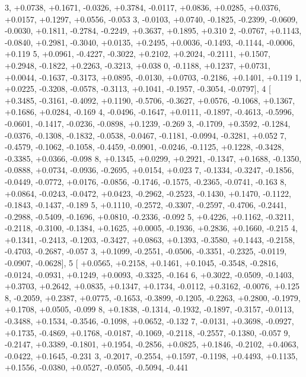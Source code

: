 \begin{DoxyCode}
      3, +0.0738, +0.1671, -0.0326, +0.3784, -0.0117, +0.0836, +0.0285, +0.0376, +0.0157, +0.1297, +0.0556, -0.053
      3, -0.0103, +0.0740, -0.1825, -0.2399, -0.0609, -0.0030, +0.1811, -0.2784, -0.2249, +0.3637, +0.1895, +0.310
      2, -0.0767, +0.1143, -0.0840, +0.2981, -0.3040, +0.0135, +0.2495, +0.0036, -0.1493, -0.1144, -0.0006, +0.119
      5, +0.0961, -0.4227, -0.3022, +0.2102, +0.2024, -0.2111, +0.1507, +0.2948, -0.1822, +0.2263, -0.3213, +0.038
      0, -0.1188, +0.1237, +0.0731, +0.0044, -0.1637, -0.3173, +0.0895, -0.0130, +0.0703, -0.2186, +0.1401, +0.119
      1, +0.0225, -0.3208, -0.0578, -0.3113, +0.1041, -0.1957, -0.3054, -0.0797],
4 [ +0.3485, -0.3161, -0.4092, +0.1190, -0.5706, -0.3627, +0.0576, -0.1068, +0.1367, +0.1686, +0.0284, -0.169
      4, -0.0496, -0.1647, +0.0111, -0.1897, -0.4613, -0.5996, -0.0601, -0.1417, -0.0236, -0.0898, +0.1239, -0.269
      3, -0.1709, +0.3592, -0.1284, -0.0376, -0.1308, -0.1832, -0.0538, -0.0467, -0.1181, -0.0994, -0.3281, +0.052
      7, -0.4579, -0.1062, -0.1058, -0.4459, -0.0901, -0.0246, -0.1125, +0.1228, -0.3428, -0.3385, +0.0366, -0.098
      8, +0.1345, +0.0299, +0.2921, -0.1347, +0.1688, -0.1350, -0.0888, +0.0734, -0.0936, -0.2695, +0.0154, +0.023
      7, -0.1334, -0.3247, -0.1856, -0.0449, -0.0772, +0.0176, -0.0856, -0.1746, -0.1575, -0.2365, -0.0741, -0.163
      8, +0.0864, -0.0243, -0.0472, +0.0423, -0.2962, -0.2523, -0.1430, +0.1470, -0.1122, -0.1843, -0.1437, -0.189
      5, +0.1110, -0.2572, -0.3307, -0.2597, -0.4706, -0.2441, -0.2988, -0.5409, -0.1696, +0.0810, -0.2336, -0.092
      5, +0.4226, +0.1162, -0.3211, -0.2118, -0.3100, -0.1384, +0.1625, +0.0005, -0.1936, +0.2836, +0.1660, -0.215
      4, +0.1341, -0.2413, -0.1203, -0.3427, +0.0863, +0.1393, -0.3580, +0.1443, -0.2158, -0.4703, -0.2687, -0.057
      3, +0.1099, -0.2551, -0.0506, -0.3351, -0.2325, -0.0119, -0.0907, -0.0628],
5 [ +0.0565, +0.2158, +0.1461, +0.1045, -0.3548, -0.2816, -0.0124, -0.0931, +0.1249, +0.0093, -0.3325, -0.164
      6, +0.3022, -0.0509, -0.1403, +0.3703, +0.2642, +0.0835, +0.1347, +0.1734, -0.0112, +0.3162, -0.0076, +0.125
      8, -0.2059, +0.2387, +0.0775, -0.1653, -0.3899, -0.1205, -0.2263, +0.2800, -0.1979, +0.1708, +0.0505, -0.099
      8, +0.1838, -0.1314, -0.1932, -0.1897, -0.3157, -0.0113, -0.3488, +0.1534, -0.3546, -0.1098, +0.0652, -0.132
      7, -0.0131, +0.3698, -0.0927, +0.1735, -0.4869, +0.1768, -0.0187, -0.1069, -0.2118, -0.2557, -0.1380, -0.057
      9, -0.2147, +0.3389, -0.1801, +0.1954, -0.2856, +0.0825, +0.1846, -0.2102, +0.4063, -0.0422, +0.1645, -0.231
      3, -0.2017, -0.2554, +0.1597, -0.1198, +0.4493, +0.1135, +0.1556, -0.0380, +0.0527, -0.0505, -0.5094, -0.441

\end{DoxyCode}
